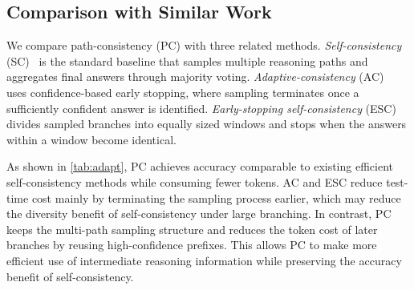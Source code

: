 \subsection{Comparison with Similar Work} 

We compare path-consistency (PC) with three related methods. 
\textit{Self-consistency} (SC)~\cite{wang2022self} is the standard baseline that samples multiple reasoning paths and aggregates final answers through majority voting. 
\textit{Adaptive-consistency} (AC)~\cite{aggarwal2023let} uses confidence-based early stopping, where sampling terminates once a sufficiently confident answer is identified. 
\textit{Early-stopping self-consistency} (ESC)~\cite{liescape} divides sampled branches into equally sized windows and stops when the answers within a window become identical.

As shown in \cref{tab:adapt}, PC achieves accuracy comparable to existing efficient self-consistency methods while consuming fewer tokens. 
AC and ESC reduce test-time cost mainly by terminating the sampling process earlier, which may reduce the diversity benefit of self-consistency under large branching. 
In contrast, PC keeps the multi-path sampling structure and reduces the token cost of later branches by reusing high-confidence prefixes. 
This allows PC to make more efficient use of intermediate reasoning information while preserving the accuracy benefit of self-consistency.

\begin{table}[t]
\caption{Performance of different efficient self-consistency methods on GSM8K, SVAMP, and StrategyQA. The percentages in parentheses denote token reduction relative to standard self-consistency.}
\label{tab:adapt}
\end{table}

